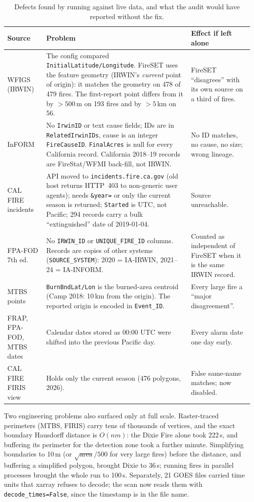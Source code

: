 \documentclass[11pt,a4paper]{article}
\begin{document}
\begin{table}[h]
\centering\small
\caption{Defects found by running against live data, and what the audit would have reported without the fix.}
\label{tab:fixes}
\begin{tabular}{@{}L{2.6cm}L{8.1cm}L{4.4cm}@{}}
\toprule
Source & Problem & Effect if left alone\\
\midrule
WFIGS (IRWIN) & The config compared \texttt{InitialLatitude/Longitude}. FireSET uses the feature geometry (IRWIN's
\emph{current} point of origin): it matches the geometry on 478 of 479 fires. The first-report point differs
from it by $>500$\,m on 193 fires and by $>5$\,km on 56. & FireSET ``disagrees'' with its own source on a third
of fires.\\
\addlinespace
InFORM & No \texttt{IrwinID} or text cause fields; IDs are in \texttt{RelatedIrwinIDs}, cause is an integer
\texttt{FireCauseID}. \texttt{FinalAcres} is null for every California record. California 2018--19 records are
FireStat/WFMI back-fill, not IRWIN. & No ID matches, no cause, no size; wrong lineage.\\
\addlinespace
CAL FIRE incidents & API moved to \texttt{incidents.fire.ca.gov} (old host returns HTTP~403 to non-generic user
agents); needs \texttt{\&year=} or only the current season is returned; \texttt{Started} is UTC, not Pacific; 294
records carry a bulk ``extinguished'' date of 2019-01-04. & Source unreachable.\\
\addlinespace
FPA-FOD 7th ed. & No \texttt{IRWIN\_ID} or \texttt{UNIQUE\_FIRE\_ID} columns. Records are copies of other systems
(\texttt{SOURCE\_SYSTEM}): 2020 = IA-IRWIN, 2021--24 = IA-INFORM. & Counted as independent of FireSET when it is the
same IRWIN record.\\
\addlinespace
MTBS points & \texttt{BurnBndLat/Lon} is the burned-area centroid (Camp 2018: 10\,km from the origin). The reported
origin is encoded in \texttt{Event\_ID}. & Every large fire a ``major disagreement''.\\
\addlinespace
FRAP, FPA-FOD, MTBS dates & Calendar dates stored as 00:00 UTC were shifted into the previous Pacific day. &
Every alarm date one day early.\\
\addlinespace
CAL FIRE FIRIS view & Holds only the current season (476 polygons, 2026). & False same-name matches; now
disabled.\\
\bottomrule
\end{tabular}
\end{table}

Two engineering problems also surfaced only at full scale. Raster-traced perimeters (MTBS, FIRIS) carry tens
of thousands of vertices, and the exact boundary Hausdorff distance is $O(nm)$: the Dixie Fire alone took
222\,s, and buffering its perimeter for the detection zone took a further minute. Simplifying boundaries to
10\,m (or $\sqrt{\text{area}}/500$ for very large fires) before the distance, and buffering a simplified polygon,
brought Dixie to 36\,s; running fires in parallel processes brought the whole run to 100\,s. Separately, 21 GOES
files carried time units that xarray refuses to decode; the scan now reads them with \texttt{decode\_times=False},
since the timestamp is in the file name.
\end{document}
